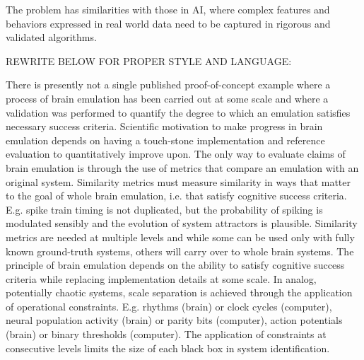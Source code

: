 \documentclass{ldr-article}
\begin{document}
The problem has similarities with those in AI, where complex features and behaviors expressed in real world data need to be captured in rigorous and validated algorithms.

REWRITE BELOW FOR PROPER STYLE AND LANGUAGE:

There is presently not a single published proof-of-concept example where a process of brain emulation has been carried out at some scale and where a validation was performed to quantify the degree to which an emulation satisfies necessary success criteria. Scientific motivation to make progress in brain emulation depends on having a touch-stone implementation and reference evaluation to quantitatively improve upon. The only way to evaluate claims of brain emulation is through the use of metrics that compare an emulation with an original system. Similarity metrics must measure similarity in ways that matter to the goal of whole brain emulation, i.e. that satisfy cognitive success criteria. E.g. spike train timing is not duplicated, but the probability of spiking is modulated sensibly and the evolution of system attractors is plausible. Similarity metrics are needed at multiple levels and while some can be used only with fully known ground-truth systems, others will carry over to whole brain systems. The principle of brain emulation depends on the ability to satisfy cognitive success criteria while replacing implementation details at some scale. In analog, potentially chaotic systems, scale separation is achieved through the application of operational constraints. E.g. rhythms (brain) or clock cycles (computer), neural population activity (brain) or parity bits (computer), action potentials (brain) or binary thresholds (computer). The application of constraints at consecutive levels limits the size of each black box in system identification.



\end{document}
